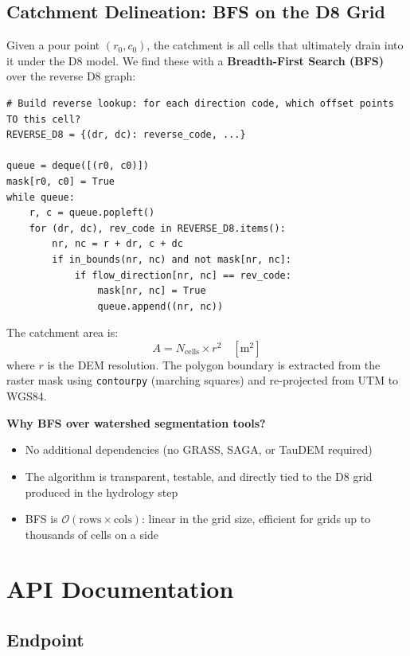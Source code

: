 \documentclass[12pt,a4paper]{article}
\begin{document}
\subsection{Catchment Delineation: BFS on the D8 Grid}

Given a pour point $(r_0, c_0)$, the catchment is all cells that ultimately drain into it under the D8 model. We find these with a \textbf{Breadth-First Search (BFS)} over the reverse D8 graph:

\begin{lstlisting}[style=bash]
# Build reverse lookup: for each direction code, which offset points TO this cell?
REVERSE_D8 = {(dr, dc): reverse_code, ...}

queue = deque([(r0, c0)])
mask[r0, c0] = True
while queue:
    r, c = queue.popleft()
    for (dr, dc), rev_code in REVERSE_D8.items():
        nr, nc = r + dr, c + dc
        if in_bounds(nr, nc) and not mask[nr, nc]:
            if flow_direction[nr, nc] == rev_code:
                mask[nr, nc] = True
                queue.append((nr, nc))
\end{lstlisting}

The catchment area is:
\begin{equation}
    A = N_{\text{cells}} \times r^2 \quad [\text{m}^2]
\end{equation}
where $r$ is the DEM resolution. The polygon boundary is extracted from the raster mask using \texttt{contourpy} (marching squares) and re-projected from UTM to WGS84.

\textbf{Why BFS over watershed segmentation tools?}
\begin{itemize}
\item No additional dependencies (no GRASS, SAGA, or TauDEM required)
\item The algorithm is transparent, testable, and directly tied to the D8 grid produced in the hydrology step
\item BFS is $\mathcal{O}(\text{rows} \times \text{cols})$: linear in the grid size, efficient for grids up to thousands of cells on a side
\end{itemize}

\section{API Documentation}

\subsection{Endpoint}
\end{document}
